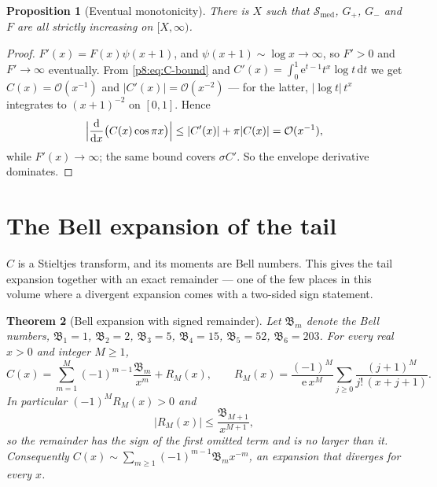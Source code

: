 \documentclass[11pt,a4paper,oneside]{book}
\theoremstyle{plain}
\newtheorem{theorem}{Theorem}[chapter]
\newtheorem{proposition}[theorem]{Proposition}
\theoremstyle{definition}
\theoremstyle{remark}
\newcommand{\e}{\mathrm{e}}
\newcommand{\dd}{\mathrm{d}}
\newcommand{\bigO}{\mathcal{O}}
\begin{document}
\begin{proposition}[Eventual monotonicity]\label{p8:prop:monotone}
There is $X$ such that $\mathcal{S}_{\mathrm{med}}$, $G_{+}$, $G_{-}$ and $F$ are
all strictly increasing on $[X,\infty)$.
\end{proposition}

\begin{proof}
$F'(x)=F(x)\psi(x+1)$, and $\psi(x+1)\sim\log x\to\infty$, so $F'>0$ and
$F'\to\infty$ eventually.  From \eqref{p8:eq:C-bound} and
$C'(x)=\int_0^{1}\e^{t-1}t^{x}\log t\,\dd t$ we get $C(x)=\bigO(x^{-1})$ and
$|C'(x)|=\bigO(x^{-2})$ --- for the latter, $|\log t|\,t^{x}$ integrates to
$(x+1)^{-2}$ on $[0,1]$.  Hence
\[
 \Bigl|\frac{\dd}{\dd x}\bigl(C(x)\cos\pi x\bigr)\Bigr|
 \le|C'(x)|+\pi|C(x)|=\bigO(x^{-1}),
\]
while $F'(x)\to\infty$; the same bound covers $\sigma C'$.  So the envelope
derivative dominates.
\end{proof}

\section{The Bell expansion of the tail}
\label{p8:sec:bell}

$C$ is a Stieltjes transform, and its moments are Bell numbers.  This gives
the tail expansion together with an exact remainder --- one of the few places
in this volume where a divergent expansion comes with a two-sided sign
statement.

\begin{theorem}[Bell expansion with signed remainder]\label{p8:thm:bell}
Let $\mathfrak{B}_m$ denote the Bell numbers, $\mathfrak{B}_1=1$, $\mathfrak{B}_2=2$, $\mathfrak{B}_3=5$,
$\mathfrak{B}_4=15$, $\mathfrak{B}_5=52$, $\mathfrak{B}_6=203$.  For every real $x>0$ and integer
$M\ge1$,
\begin{equation}\label{p8:eq:bell-expansion}
 C(x)=\sum_{m=1}^{M}(-1)^{m-1}\frac{\mathfrak{B}_m}{x^{m}}+R_M(x),
 \qquad
 R_M(x)=\frac{(-1)^{M}}{\e\,x^{M}}
 \sum_{j\ge0}\frac{(j+1)^{M}}{j!\,(x+j+1)} .
\end{equation}
In particular $(-1)^{M}R_M(x)>0$ and
\begin{equation}\label{p8:eq:bell-bound}
 |R_M(x)|\le\frac{\mathfrak{B}_{M+1}}{x^{M+1}} ,
\end{equation}
so the remainder has the sign of the first omitted term and is no larger than
it.  Consequently
$C(x)\sim\sum_{m\ge1}(-1)^{m-1}\mathfrak{B}_m x^{-m}$, an expansion that diverges for
every $x$.
\end{theorem}
\end{document}
